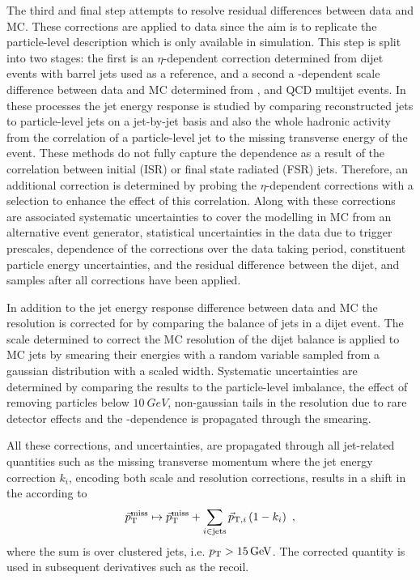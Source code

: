 The third and final step attempts to resolve residual differences between data and MC. These corrections are applied to data since the aim is to replicate the particle-level description which is only available in simulation. This step is split into two stages: the first is an $\eta$-dependent correction determined from dijet events with barrel jets used as a reference, and a second a \pt-dependent scale difference between data and MC determined from \IDYllj, \Igj and QCD multijet events. In these processes the jet energy response is studied by comparing reconstructed jets to particle-level jets on a jet-by-jet basis and also the whole hadronic activity from the correlation of a particle-level jet to the missing transverse energy of the event. These methods do not fully capture the dependence as a result of the correlation between initial (ISR) or final state radiated (FSR) jets. Therefore, an additional correction is determined by probing the $\eta$-dependent corrections with a selection to enhance the effect of this correlation. Along with these corrections are associated systematic uncertainties to cover the modelling in MC from an alternative event generator, statistical uncertainties in the data due to trigger prescales, dependence of the corrections over the data taking period, constituent particle energy uncertainties, and the residual difference between the dijet, \Igj and \IDYllj samples after all corrections have been applied.

In addition to the jet energy response difference between data and MC the resolution is corrected for by comparing the balance of jets in a dijet event. The scale determined to correct the MC resolution of the dijet balance is applied to MC jets by smearing their energies with a random variable sampled from a gaussian distribution with a scaled width. Systematic uncertainties are determined by comparing the results to the particle-level imbalance, the effect of removing particles below $\SI{10}{GeV}$, non-gaussian tails in the resolution due to rare detector effects and the \pt-dependence is propagated through the smearing.

All these corrections, and uncertainties, are propagated through all jet-related quantities such as the missing transverse momentum where the jet energy correction $k_i$, encoding both scale and resolution corrections, results in a shift in the \ptmiss according to
%
\begin{equation}\label{eq:ptmiss-type1-corr}
    \vecptmiss \mapsto \vecptmiss + \sum_{i\in\mathrm{jets}}\vec{p}_{\mathrm{T},i} \left( 1 - k_i \right)\ ,
\end{equation}
%
where the sum is over clustered jets, i.e. ${p_{\text{T}}>\SI{15}{GeV}}$. The corrected \ptmiss quantity is used in subsequent derivatives such as the recoil.


